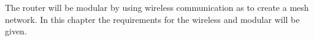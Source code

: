 The router will be modular by using wireless communication as to create a mesh network. In this chapter the requirements for the wireless and modular will be given.

